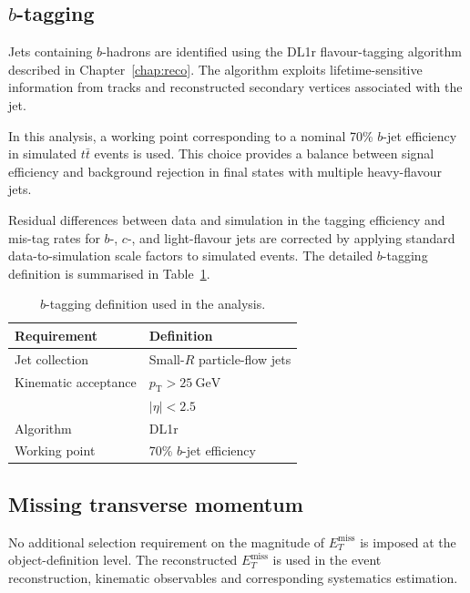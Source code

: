 \subsection{$b$-tagging}
\label{subsec:obj-btag}

Jets containing $b$-hadrons are identified using the DL1r
flavour-tagging algorithm described in
Chapter~\ref{chap:reco}. The algorithm exploits lifetime-sensitive
information from tracks and reconstructed secondary vertices
associated with the jet.

In this analysis, a working point corresponding to a nominal
70\% $b$-jet efficiency in simulated $t\bar{t}$ events is used.
This choice provides a balance between signal efficiency and
background rejection in final states with multiple heavy-flavour
jets.

Residual differences between data and simulation in the tagging
efficiency and mis-tag rates for $b$-, $c$-, and light-flavour
jets are corrected by applying standard data-to-simulation
scale factors to simulated events.
The detailed $b$-tagging definition is summarised in
Table~\ref{tab:object:btag}.

\begin{table}[ht]
  \caption{$b$-tagging definition used in the analysis.}
  \label{tab:object:btag}
  \centering
  \begin{tabular}{ll}
    \toprule
    Requirement & Definition \\
    \midrule
    Jet collection & Small-$R$ particle-flow jets \\
    Kinematic acceptance &
    $p_{\mathrm{T}} > 25~\mathrm{GeV}$ \\
    &
    $|\eta| < 2.5$ \\
    \midrule
    Algorithm & DL1r \\
    Working point & 70\% $b$-jet efficiency \\
    \bottomrule
  \end{tabular}
\end{table}

\subsection{Missing transverse momentum}
\label{subsec:obj-met}

No additional selection requirement on the magnitude of
$E^{\mathrm{miss}}_T$ is imposed at the object-definition
level. The reconstructed $E^{\mathrm{miss}}_T$ is used
in the event reconstruction, kinematic observables and corresponding systematics estimation.

